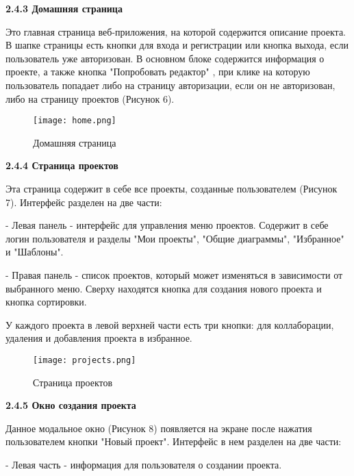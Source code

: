 \textbf{2.4.3 Домашняя страница}

Это главная страница веб-приложения, на которой содержится описание проекта.
В шапке страницы есть кнопки для входа и регистрации или кнопка выхода, если пользователь уже авторизован. В основном блоке содержится информация о проекте, а также кнопка "Попробовать редактор" , при клике на которую пользователь попадает либо на страницу авторизации, если он не авторизован, либо на страницу проектов (Рисунок 6).

\renewcommand{\figurename}{Рисунок}
\begin{figure}[htbp]
    \centering %
    \texttt{[image: home.png]}
    \caption{Домашняя страница}
    \label{fig:analyze} %
\end{figure}

\textbf{2.4.4 Страница проектов}

Эта страница содержит в себе все проекты, созданные пользователем (Рисунок 7). Интерфейс разделен на две части:

    - Левая панель - интерфейс для управления меню проектов. Содержит в себе логин пользователя и разделы "Мои проекты", "Общие диаграммы", "Избранное" и "Шаблоны".
    
    - Правая панель - список проектов, который может изменяться в зависимости от выбранного меню. Сверху находятся кнопка для создания нового проекта и кнопка сортировки.

У каждого проекта в левой верхней части есть три кнопки: для коллаборации, удаления и добавления проекта в избранное.

\renewcommand{\figurename}{Рисунок}
\begin{figure}[htbp]
    \centering %
    \texttt{[image: projects.png]}
    \caption{Страница проектов}
    \label{fig:analyze} %
\end{figure}

\newpage

\textbf{2.4.5 Окно создания проекта}

Данное модальное окно (Рисунок 8) появляется на экране после нажатия пользователем кнопки "Новый проект". Интерфейс в нем разделен на две части:

    - Левая часть - информация для пользователя о создании проекта.
    

